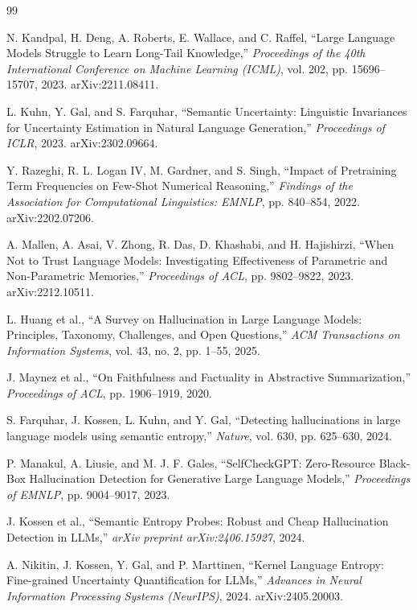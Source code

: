 \documentclass[oneside,ko,under]{snuthesis}
\begin{document}
\begin{thebibliography}{99}

N. Kandpal, H. Deng, A. Roberts, E. Wallace, and C. Raffel,
``Large Language Models Struggle to Learn Long-Tail Knowledge,''
\textit{Proceedings of the 40th International Conference on Machine Learning (ICML)}, vol. 202, pp. 15696--15707, 2023. arXiv:2211.08411.

L. Kuhn, Y. Gal, and S. Farquhar,
``Semantic Uncertainty: Linguistic Invariances for Uncertainty Estimation in Natural Language Generation,''
\textit{Proceedings of ICLR}, 2023. arXiv:2302.09664.

Y. Razeghi, R. L. Logan IV, M. Gardner, and S. Singh,
``Impact of Pretraining Term Frequencies on Few-Shot Numerical Reasoning,''
\textit{Findings of the Association for Computational Linguistics: EMNLP}, pp. 840--854, 2022. arXiv:2202.07206.

A. Mallen, A. Asai, V. Zhong, R. Das, D. Khashabi, and H. Hajishirzi,
``When Not to Trust Language Models: Investigating Effectiveness of Parametric and Non-Parametric Memories,''
\textit{Proceedings of ACL}, pp. 9802--9822, 2023. arXiv:2212.10511.

L. Huang et al.,
``A Survey on Hallucination in Large Language Models: Principles, Taxonomy, Challenges, and Open Questions,''
\textit{ACM Transactions on Information Systems}, vol. 43, no. 2, pp. 1--55, 2025.

J. Maynez et al.,
``On Faithfulness and Factuality in Abstractive Summarization,''
\textit{Proceedings of ACL}, pp. 1906--1919, 2020.

S. Farquhar, J. Kossen, L. Kuhn, and Y. Gal,
``Detecting hallucinations in large language models using semantic entropy,''
\textit{Nature}, vol. 630, pp. 625--630, 2024.

P. Manakul, A. Liusie, and M. J. F. Gales,
``SelfCheckGPT: Zero-Resource Black-Box Hallucination Detection for Generative Large Language Models,''
\textit{Proceedings of EMNLP}, pp. 9004--9017, 2023.

J. Kossen et al.,
``Semantic Entropy Probes: Robust and Cheap Hallucination Detection in LLMs,''
\textit{arXiv preprint arXiv:2406.15927}, 2024.

A. Nikitin, J. Kossen, Y. Gal, and P. Marttinen,
``Kernel Language Entropy: Fine-grained Uncertainty Quantification for LLMs,''
\textit{Advances in Neural Information Processing Systems (NeurIPS)}, 2024. arXiv:2405.20003.


\end{thebibliography}
\end{document}
